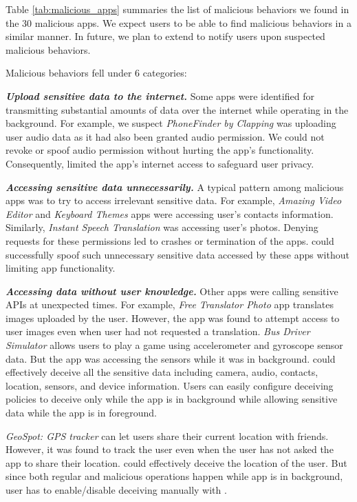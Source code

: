 

Table \ref{tab:malicious_apps} summaries the list of malicious behaviors we found 
in the 30 malicious apps. We expect users to be able to find malicious behaviors
in a similar manner. In future, we plan to extend \framework to notify users upon 
suspected malicious behaviors.

Malicious behaviors fell under 6 categories:

\noindent\textbf{\textit{Upload sensitive data to the internet.}} Some apps were
identified for transmitting substantial amounts of data over the internet while
operating in the background. For example, we suspect \textit{PhoneFinder by
Clapping} was uploading user audio data as it had also been granted audio
permission. We could not revoke or spoof audio permission without hurting the
app's functionality. Consequently, \framework limited the app's internet access
to safeguard user privacy.

\noindent\textbf{\textit{Accessing sensitive data unnecessarily.}} A typical
pattern among malicious apps was to try to access irrelevant sensitive data. For
example, \textit{Amazing Video Editor} and \textit{Keyboard Themes} apps were
accessing user's contacts information. Similarly, \textit{Instant Speech
Translation} was accessing user's photos. Denying requests for these permissions
led to crashes or termination of the apps. \framework could successfully spoof
such unnecessary sensitive data accessed by these apps without limiting app
functionality.

\noindent\textbf{\textit{Accessing data without user knowledge.}} Other apps 
were calling sensitive APIs at unexpected times. For example, \textit{Free
Translator Photo} app translates images uploaded by the user. However, the app
was found to attempt access to user images even when user had not requested a
translation. \textit{Bus Driver Simulator} allows users to play a game using
accelerometer and gyroscope sensor data. But the app was accessing the sensors
while it was in background. \framework could effectively deceive all the
sensitive data including camera, audio, contacts, location, sensors, and device
information. Users can easily configure deceiving policies to deceive only while
the app is in background while allowing sensitive data while the app is in
foreground.

\textit{GeoSpot: GPS tracker} can let users share their current location with
friends. However, it was found to track the user even when the user has not
asked the app to share their location. \framework could effectively deceive the
location of the user. But since both regular and malicious operations happen
while app is in background, user has to enable/disable deceiving manually with
\framework.

